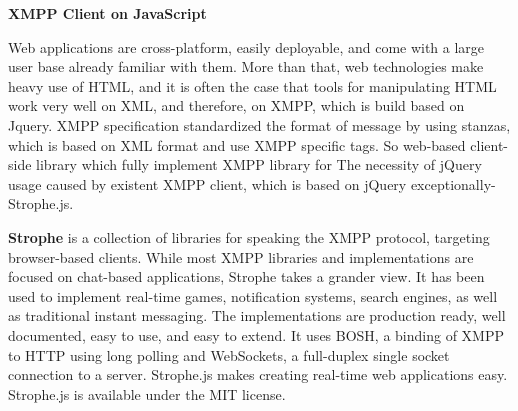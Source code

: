     \textbf{XMPP Client on JavaScript}

	Web applications are cross-platform, easily deployable, and come with a large user base already familiar with them. More than that, web technologies make heavy use of HTML, and it is often the case that tools for manipulating HTML work very well on XML, and therefore, on XMPP, which is build based on Jquery. XMPP specification standardized the format of message by using stanzas, which is based on XML format and use XMPP specific tags. So web-based client-side library which fully implement XMPP library for The necessity of jQuery usage caused by existent XMPP client, which is based on jQuery exceptionally-Strophe.js.

    \textbf{Strophe} is a collection of libraries for speaking the XMPP protocol, targeting browser-based clients. While most XMPP libraries and implementations are focused on chat-based applications, Strophe takes a grander view. It has been used to implement real-time games, notification systems, search engines, as well as traditional instant messaging. The implementations are production ready, well documented, easy to use, and easy to extend. It uses BOSH, a binding of XMPP to HTTP using long polling and WebSockets, a full-duplex single socket connection to a server. Strophe.js makes creating real-time web applications easy. Strophe.js is available under the MIT license.


